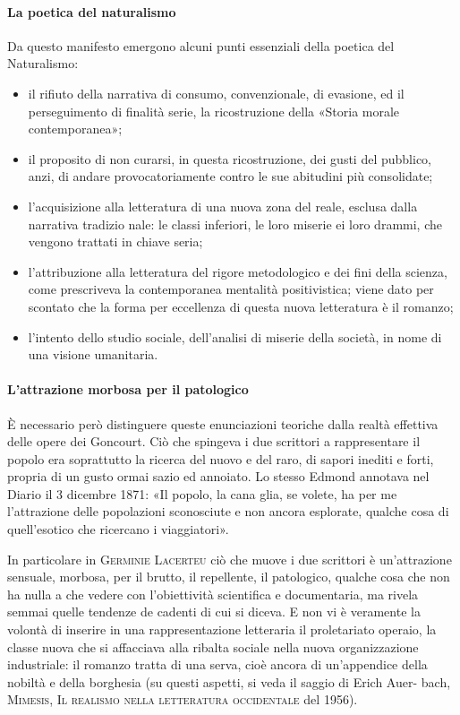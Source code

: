 \documentclass{book}
\begin{document}
\paragraph{La poetica del naturalismo} Da questo manifesto emergono alcuni punti essenziali della poetica del Naturalismo: 
\begin{itemize}
\item il rifiuto della narrativa di consumo, convenzionale, di evasione, ed il perseguimento di finalità serie, la ricostruzione della «Storia morale contemporanea»; 
\item il proposito di non curarsi, in questa ricostruzione, dei gusti del pubblico, anzi, di andare provocatoriamente contro le sue abitudini più consolidate; 
\item l'acquisizione alla letteratura di una nuova zona del reale, esclusa dalla narrativa tradizio nale: le classi inferiori, le loro miserie ei loro drammi, che vengono trattati in chiave seria; 
\item l'attribuzione alla letteratura del rigore metodologico e dei fini della scienza, come prescriveva la contemporanea mentalità positivistica; viene dato per scontato che la forma per eccellenza di questa nuova letteratura è il romanzo;
\item l'intento dello studio sociale, dell'analisi di miserie della società, in nome di una visione umanitaria.
\end{itemize}

\paragraph{L'attrazione morbosa per il patologico} È necessario però distinguere queste enunciazioni teoriche dalla realtà effettiva delle opere dei Goncourt. Ciò che spingeva i due scrittori a rappresentare il popolo era soprattutto la ricerca del nuovo e del raro, di sapori inediti e forti, propria di un gusto ormai sazio ed annoiato. Lo stesso Edmond annotava nel Diario il 3 dicembre 1871: «Il popolo, la cana glia, se volete, ha per me l'attrazione delle popolazioni sconosciute e non ancora esplorate, qualche cosa di quell'esotico che ricercano i viaggiatori».

In particolare in \textsc{Germinie Lacerteu} ciò che muove i due scrittori è un'attrazione sensuale, morbosa, per il brutto, il repellente, il patologico, qualche cosa che non ha nulla a che vedere con l'obiettività scientifica e documentaria, ma rivela semmai quelle tendenze de cadenti di cui si diceva. E non vi è veramente la volontà di inserire in una rappresentazione letteraria il proletariato operaio, la classe nuova che si affacciava alla ribalta sociale nella nuova organizzazione industriale: il romanzo tratta di una serva, cioè ancora di un'appendice della nobiltà e della borghesia (su questi aspetti, si veda il saggio di Erich Auer- bach, \textsc{Mimesis, Il realismo nella letteratura occidentale} del 1956).
\end{document}
